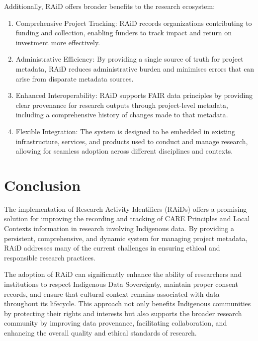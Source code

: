 \documentclass[a0,portrait]{a0poster}
\begin{document}
\begin{multicols}{2}
{%


Additionally, RAiD offers broader benefits to the research ecosystem:

\begin{enumerate}
  \item Comprehensive Project Tracking: RAiD records organizations contributing to funding and collection, enabling funders to track impact and return on investment more effectively.
  \item Administrative Efficiency: By providing a single source of truth for project metadata, RAiD reduces administrative burden and minimises errors that can arise from disparate metadata sources.
  \item Enhanced Interoperability: RAiD supports FAIR data principles by providing clear provenance for research outputs through project-level metadata, including a comprehensive history of changes made to that metadata.
  \item Flexible Integration: The system is designed to be embedded in existing infrastructure, services, and products used to conduct and manage research, allowing for seamless adoption across different disciplines and contexts.
\end{enumerate}

}

\color{ARDCPink}
\section*{\LARGE Conclusion}
\color{DarkGrey}
\large{
The implementation of Research Activity Identifiers (RAiDs) offers a promising solution for improving the recording and tracking of CARE Principles and Local Contexts information in research involving Indigenous data. By providing a persistent, comprehensive, and dynamic system for managing project metadata, RAiD addresses many of the current challenges in ensuring ethical and responsible research practices.

The adoption of RAiD can significantly enhance the ability of researchers and institutions to respect Indigenous Data Sovereignty, maintain proper consent records, and ensure that cultural context remains associated with data throughout its lifecycle. This approach not only benefits Indigenous communities by protecting their rights and interests but also supports the broader research community by improving data provenance, facilitating collaboration, and enhancing the overall quality and ethical standards of research.

}
\end{multicols}
\end{document}
